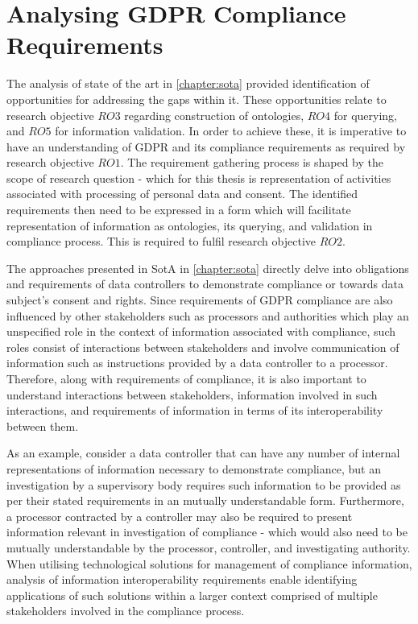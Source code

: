\chapter{Analysing GDPR Compliance Requirements}
\label{chapter:information}

The analysis of state of the art in \autoref{chapter:sota} provided identification of opportunities for addressing the gaps within it.
These opportunities relate to research objective $RO3$ regarding construction of ontologies, $RO4$ for querying, and $RO5$ for information validation.
In order to achieve these, it is imperative to have an understanding of GDPR and its compliance requirements as required by research objective $RO1$.
The requirement gathering process is shaped by the scope of research question - which for this thesis is representation of activities associated with processing of personal data and consent.
The identified requirements then need to be expressed in a form which will facilitate representation of information as ontologies, its querying, and validation in compliance process. This is required to fulfil research objective $RO2$.

The approaches presented in SotA in \autoref{chapter:sota} directly delve into obligations and requirements of data controllers to demonstrate compliance or towards data subject's consent and rights.
Since requirements of GDPR compliance are also influenced by other stakeholders such as processors and authorities which play an unspecified role in the context of information associated with compliance, such roles consist of interactions between stakeholders and involve communication of information such as instructions provided by a data controller to a processor.
Therefore, along with requirements of compliance, it is also important to understand interactions between stakeholders, information involved in such interactions, and requirements of information in terms of its interoperability between them.

As an example, consider a data controller that can have any number of internal representations of information necessary to demonstrate compliance, but an investigation by a supervisory body requires such information to be provided as per their stated requirements in an mutually understandable form. Furthermore, a processor contracted by a controller may also be required to present information relevant in investigation of compliance - which would also need to be mutually understandable by the processor, controller, and investigating authority.
When utilising technological solutions for management of compliance information, analysis of information interoperability requirements enable identifying applications of such solutions within a larger context comprised of multiple stakeholders involved in the compliance process.

